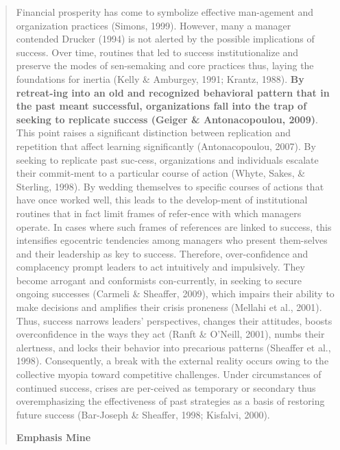 \begin{quote}
Financial prosperity has come to symbolize effective man-agement and organization practices (Simons, 1999). However, many a manager contended Drucker (1994) is not alerted by the possible implications of success. Over time, routines that led to success institutionalize and preserve the modes of sen-semaking and core practices thus, laying the foundations for inertia (Kelly \& Amburgey, 1991; Krantz, 1988). {\bf By retreat-ing into an old and recognized behavioral pattern that in the past  meant  successful,  organizations  fall  into  the  trap  of  seeking  to  replicate  success  (Geiger  \&  Antonacopoulou,  2009)}.  This  point  raises  a  significant  distinction  between  replication  and  repetition  that  affect  learning  significantly  (Antonacopoulou,  2007).  By  seeking  to  replicate  past  suc-cess,  organizations  and  individuals  escalate  their  commit-ment  to  a  particular  course  of  action  (Whyte,  Sakes,  \&  Sterling, 1998). By wedding themselves to specific courses of actions that have once worked well, this leads to the develop-ment of institutional routines that in fact limit frames of refer-ence  with  which  managers  operate.  In  cases  where  such  frames  of  references  are  linked  to  success,  this  intensifies  egocentric  tendencies  among  managers  who  present  them-selves and their leadership as key to success. Therefore, over-confidence and complacency prompt leaders to act intuitively and impulsively. They become arrogant and conformists con-currently, in seeking to secure ongoing successes (Carmeli \& Sheaffer, 2009), which impairs their ability to make decisions and  amplifies  their  crisis  proneness  (Mellahi  et  al.,  2001).  Thus,  success  narrows  leaders’  perspectives,  changes  their  attitudes, boosts overconfidence in the ways they act (Ranft \&  O’Neill,  2001),  numbs  their  alertness,  and  locks  their  behavior  into  precarious  patterns  (Sheaffer  et  al.,  1998).  Consequently, a break with the external reality occurs owing to  the  collective  myopia  toward  competitive  challenges.  Under  circumstances  of  continued  success,  crises  are  per-ceived as temporary or secondary thus overemphasizing the effectiveness  of  past  strategies  as  a  basis  of  restoring  future  success (Bar-Joseph \& Sheaffer, 1998; Kisfalvi, 2000).
\begin{flushright}
{\bf Emphasis Mine}
\end{flushright}
\end{quote}

